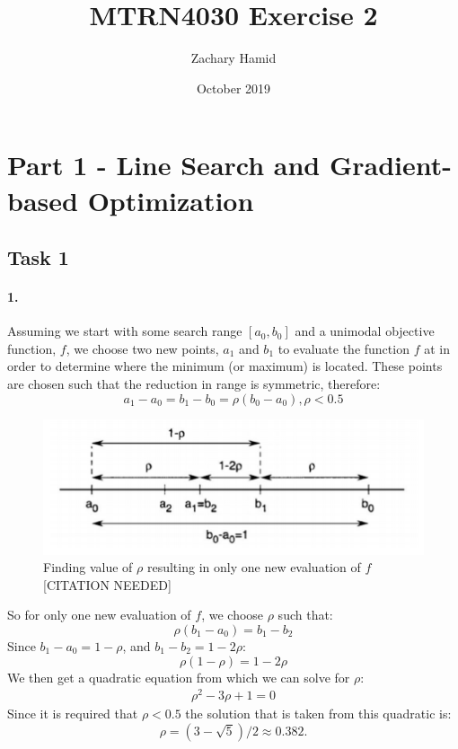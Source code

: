 \documentclass{article}
\title{MTRN4030 Exercise 2}
\author{Zachary Hamid}
\date{October 2019}
\begin{document}
\maketitle
\section{Part 1 - Line Search and Gradient-based Optimization}
\subsection{Task 1}
\paragraph*{1.} Assuming we start with some search range $[a_{0},b_{0}]$ and a unimodal objective function, $f$, we choose two new points, $a_{1}$ and $b_{1}$ to evaluate the function $f$ at in order to determine where the minimum (or maximum) is located. These points are chosen such that the reduction in range is symmetric, therefore:
\begin{equation}
    a_{1} - a_{0} = b_{1} - b_{0} = \rho(b_{0}-a_{0}), \rho < 0.5
\end{equation}
\begin{figure}[!h]
    \centering
    \includegraphics[scale=0.8]{task1/task1-2.png}
    \caption{Finding value of $\rho$ resulting in only one new evaluation of $f$ [CITATION NEEDED]}
    \label{fig:task1-1}
\end{figure}
So for only one new evaluation of $f$, we choose $\rho$ such that:
\begin{equation*}
    \rho(b_{1} - a_{0}) = b_{1} - b_{2}
\end{equation*}
Since $b_{1} - a_{0} = 1 - \rho$, and $b_{1} - b_{2} = 1 - 2\rho$:
\begin{equation*}
    \rho(1 - \rho) = 1 - 2\rho
\end{equation*}
We then get a quadratic equation from which we can solve for $\rho$:
\begin{eqnarray*}
    \rho^{2} - 3\rho + 1 = 0
\end{eqnarray*}
Since it is required that $\rho < 0.5$ the solution that is taken from this quadratic is:
\begin{equation*}
    \rho = (3 −\sqrt{5})/2 \approx 0.382.
\end{equation*}
\end{document}
